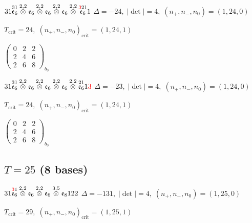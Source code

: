 \documentclass[10pt]{article}
\begin{document}
\smallskip

$31\overset{31}{\mathfrak{e}_6}\overset{2,2}{\otimes}\mathfrak{e}_6\overset{2,2}{\otimes}\mathfrak{e}_6\overset{2,2}{\otimes}\mathfrak{e}_6\overset{2,2}{\otimes}\overset{\textcolor{red}{3}21}{\mathfrak{e}_6}1$ \quad $\Delta=-24,\; |\det|=4,\; (n_+,n_-,n_0)=(1,24,0)$

\hspace{1em}$T_{\text{crit}}=24,\; (n_+,n_-,n_0)_{\text{crit}}=(1,24,1)$

\hspace{2em}$\left(\begin{smallmatrix}0 & 2 & 2 \\ 2 & 4 & 6 \\ 2 & 6 & 8\end{smallmatrix}\right)_{\!b_0}$

$31\overset{31}{\mathfrak{e}_6}\overset{2,2}{\otimes}\mathfrak{e}_6\overset{2,2}{\otimes}\mathfrak{e}_6\overset{2,2}{\otimes}\mathfrak{e}_6\overset{2,2}{\otimes}\overset{21}{\mathfrak{e}_6}1\textcolor{red}{3}$ \quad $\Delta=-23,\; |\det|=4,\; (n_+,n_-,n_0)=(1,24,0)$

\hspace{1em}$T_{\text{crit}}=24,\; (n_+,n_-,n_0)_{\text{crit}}=(1,24,1)$

\hspace{2em}$\left(\begin{smallmatrix}0 & 2 & 2 \\ 2 & 4 & 6 \\ 2 & 6 & 8\end{smallmatrix}\right)_{\!b_0}$


\subsection*{$T = 25$ \quad (8 bases)}
\smallskip

$31\overset{\textcolor{red}{3}1}{\mathfrak{e}_6}\overset{2,2}{\otimes}\mathfrak{e}_6\overset{2,2}{\otimes}\mathfrak{e}_6\overset{3,5}{\otimes}\mathfrak{e}_8122$ \quad $\Delta=-131,\; |\det|=4,\; (n_+,n_-,n_0)=(1,25,0)$

\hspace{1em}$T_{\text{crit}}=29,\; (n_+,n_-,n_0)_{\text{crit}}=(1,25,1)$
\end{document}
